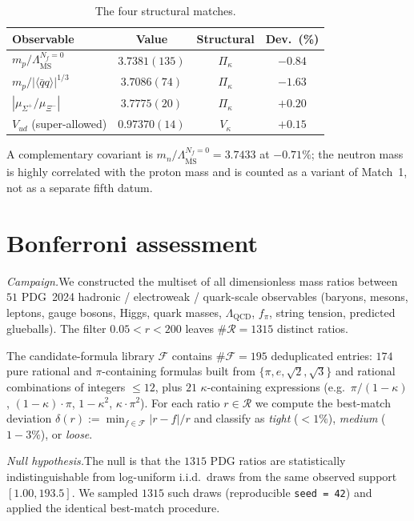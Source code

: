 \documentclass[aps,prl,reprint,amsmath,amssymb,nofootinbib,floatfix,superscriptaddress]{revtex4-2}
\newcommand{\calF}{\mathcal{F}}
\newcommand{\calR}{\mathcal{R}}
\newcommand{\msbar}{\overline{\mathrm{MS}}}
\newcommand{\Piskappa}{\Pi_{\kappa}}
\newcommand{\Vskappa}{V_{\kappa}}
\newcommand{\LambdaPG}{\Lambda^{N_f = 0}_{\msbar}}
\begin{document}
\begin{table}[t]
\caption{The four structural matches.}
\label{tab:matches}
\begin{ruledtabular}
\begin{tabular}{lccc}
Observable & Value & Structural & Dev.~(\%) \\
\hline
$m_p / \LambdaPG$         & $3.7381(135)$  & $\Piskappa$ & $-0.84$ \\
$m_p / |\langle\bar{q}q\rangle|^{1/3}$ & $3.7086(74)$ & $\Piskappa$ & $-1.63$ \\
$|\mu_{\Sigma^+}/\mu_{\Xi^-}|$ & $3.7775(20)$  & $\Piskappa$ & $+0.20$ \\
$V_{ud}$ (super-allowed)  & $0.97370(14)$ & $\Vskappa$  & $+0.15$ \\
\end{tabular}
\end{ruledtabular}
\end{table}

A complementary covariant is $m_n / \LambdaPG = 3.7433$ at $-0.71\%$; the neutron mass is highly correlated with the proton mass and is counted as a variant of Match~1, not as a separate fifth datum.

\section{Bonferroni assessment}
\label{sec:bonferroni}

\textit{Campaign.}\quad We constructed the multiset of all dimensionless mass ratios between $51$ PDG~2024 hadronic / electroweak / quark-scale observables (baryons, mesons, leptons, gauge bosons, Higgs, quark masses, $\Lambda_{\mathrm{QCD}}$, $f_\pi$, string tension, predicted glueballs). The filter $0.05 < r < 200$ leaves $\#\calR = 1315$ distinct ratios.

The candidate-formula library $\calF$ contains $\#\calF = 195$ deduplicated entries: $174$ pure rational and $\pi$-containing formulas built from $\{\pi, e, \sqrt{2}, \sqrt{3}\}$ and rational combinations of integers $\le 12$, plus $21$ $\kappa$-containing expressions (e.g.\ $\pi/(1{-}\kappa)$, $(1{-}\kappa)\cdot\pi$, $1{-}\kappa^2$, $\kappa\cdot\pi^2$). For each ratio $r \in \calR$ we compute the best-match deviation $\delta(r) := \min_{f \in \calF} |r - f|/r$ and classify as \emph{tight} ($< 1\%$), \emph{medium} ($1\!-\!3\%$), or \emph{loose}.

\textit{Null hypothesis.}\quad The null is that the $1315$ PDG ratios are statistically indistinguishable from log-uniform i.i.d.\ draws from the same observed support $[1.00, 193.5]$. We sampled $1315$ such draws (reproducible \texttt{seed = 42}) and applied the identical best-match procedure.
\end{document}
